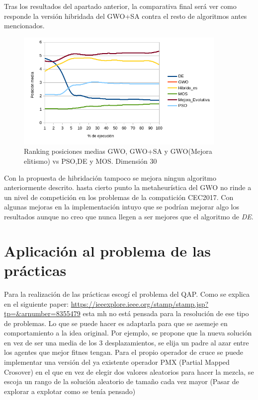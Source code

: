 \documentclass[a4paper]{report}
\begin{document}
Tras los resultados del apartado anterior, la comparativa final será ver como responde la versión hibridada del GWO+SA contra el resto de algoritmos antes mencionados.






\begin{figure}[H]
    \centering
    \caption{Ranking posiciones medias GWO, GWO+SA y GWO(Mejora elitismo) vs PSO,DE y MOS. Dimensión 30}
    \includegraphics[width=0.9\textwidth]{Resultados/Analisis_final/D30/Todos/Grafico_puestos.png}

\end{figure}

Con la propuesta de hibridación tampoco se mejora ningun algoritmo anteriormente descrito. hasta cierto punto la metaheurística del GWO no rinde a un nivel de competición en los problemas de la compatición CEC2017. Con algunas mejoras en la implementación intuyo que se podrían mejorar algo los resultados aunque no creo que nunca llegen a ser mejores que el algoritmo de \textit{DE}.



\section{Aplicación al problema de las prácticas}

Para la realización de las prácticas escogí el problema del QAP. Como se explica en el siguiente paper: \url{https://ieeexplore.ieee.org/stamp/stamp.jsp?tp=&arnumber=8355479} esta mh no está pensada para la resolución de ese tipo de problemas. Lo que se puede hacer es adaptarla para que se asemeje en comportamiento a la idea original. Por ejemplo, se propone que la nueva solución en vez de ser una media de los 3 desplazamientos, se elija un padre al azar entre los agentes que mejor fitnes tengan. Para el propio operador de cruce se puede implementar una versión del ya existente operador PMX (Partial Mapped Crosover) en el que en vez de elegir dos valores aleatorios para hacer la mezcla, se escoja un rango de la solución aleatorio de tamaño cada vez mayor (Pasar de explorar a explotar como se tenía pensado)
\end{document}
